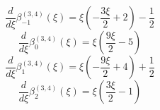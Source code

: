 
\begin{equation}
\frac{d}{d\xi}\beta_{-1}^{(3,4)} (\xi) =
 \xi \left(- \frac{3 \xi}{2} + 2\right) - \frac{1}{2}
\end{equation}
\begin{equation}
\frac{d}{d\xi}\beta_{0}^{(3,4)} (\xi) =
 \xi \left(\frac{9 \xi}{2} - 5\right)
\end{equation}
\begin{equation}
\frac{d}{d\xi}\beta_{1}^{(3,4)} (\xi) =
 \xi \left(- \frac{9 \xi}{2} + 4\right) + \frac{1}{2}
\end{equation}
\begin{equation}
\frac{d}{d\xi}\beta_{2}^{(3,4)} (\xi) =
 \xi \left(\frac{3 \xi}{2} - 1\right)
\end{equation}
